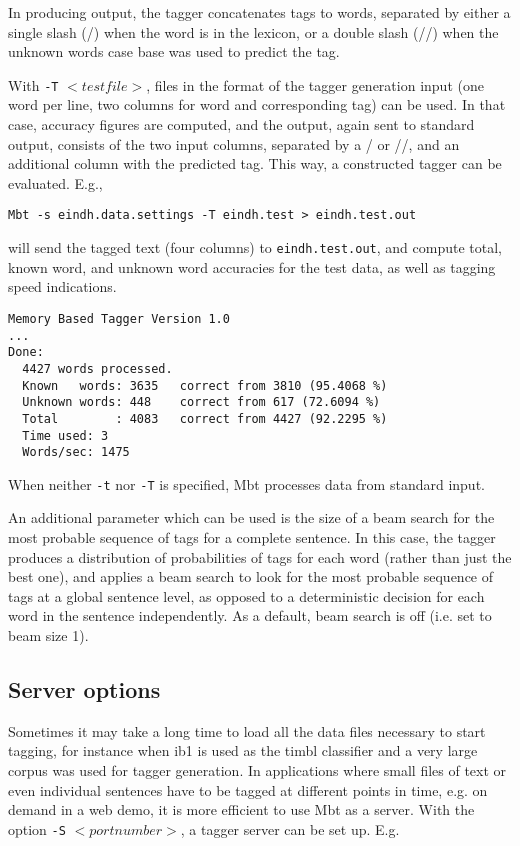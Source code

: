 \documentclass{report}
\begin{document}
In producing output, the tagger concatenates tags to words,
separated by either a single slash (/) when the word is in the
lexicon, or a double slash (//) when the unknown words case base was
used to predict the tag.

With {\tt -T} $<testfile>$, files in the format of the tagger generation
input (one word per line, two columns for word and corresponding tag)
can be used. In that case, accuracy figures are computed, and the
output, again sent to standard output, consists of the two input
columns, separated by a / or //, and an additional column with the
predicted tag. This way, a constructed tagger can be evaluated. E.g., 

{\small
\begin{verbatim}
Mbt -s eindh.data.settings -T eindh.test > eindh.test.out
\end{verbatim}
}

will send the tagged text (four columns) to {\tt eindh.test.out},
and compute total, known word, and unknown word accuracies for the
test data, as well as tagging speed indications.

{\small
\begin{verbatim}
Memory Based Tagger Version 1.0
...
Done:
  4427 words processed.
  Known   words: 3635   correct from 3810 (95.4068 %)
  Unknown words: 448    correct from 617 (72.6094 %)
  Total        : 4083   correct from 4427 (92.2295 %)
  Time used: 3
  Words/sec: 1475
\end{verbatim}
}

When neither {\tt -t} nor {\tt -T} is specified, Mbt processes data from
standard input.

An additional parameter which can be used is the size of a beam
search for the most probable sequence of tags for a complete
sentence. In this case, the tagger produces a distribution of
probabilities of tags for each word (rather than just the best one),
and applies a beam search to look for the most probable sequence of
tags at a global sentence level, as opposed to a deterministic
decision for each word in the sentence independently. As a default,
beam search is off (i.e. set to beam size 1). 

\subsection{Server options}

Sometimes it may take a long time to load all the data files necessary
to start tagging, for instance when {\sc ib1} is used as the {\sc
timbl} classifier and a very large corpus was used for tagger
generation. In applications where small files of text or even
individual sentences have to be tagged at different points in time,
e.g. on demand in a web demo, it is more efficient to use Mbt as
a server. With the option {\tt -S} $<portnumber>$, a tagger server can be
set up. E.g.
\end{document}
